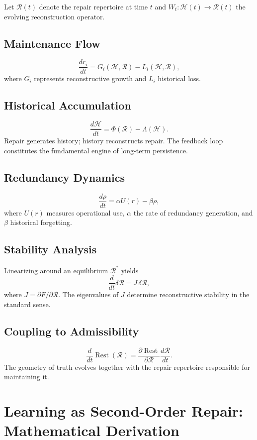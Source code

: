 \documentclass[12pt,oneside]{article}
\theoremstyle{plain}
\theoremstyle{definition}
\theoremstyle{remark}
\theoremstyle{plain}
\DeclareMathOperator{\Rest}{Rest}
\newcommand{\Hist}{\mathcal{H}}
\begin{document}
Let $\mathcal{R}(t)$ denote the repair repertoire at time $t$ and $W_t : \Hist(t) \rightarrow
\mathcal{R}(t)$ the evolving reconstruction operator.

\subsection{Maintenance Flow}

\[
\frac{dr_i}{dt} = G_i(\Hist, \mathcal{R}) - L_i(\Hist, \mathcal{R}),
\]
where $G_i$ represents reconstructive growth and $L_i$ historical loss.

\subsection{Historical Accumulation}

\[
\frac{d\Hist}{dt} = \Phi(\mathcal{R}) - \Lambda(\Hist).
\]
Repair generates history; history reconstructs repair. The feedback loop constitutes the
fundamental engine of long-term persistence.

\subsection{Redundancy Dynamics}

\[
\frac{d\rho}{dt} = \alpha U(r) - \beta\rho,
\]
where $U(r)$ measures operational use, $\alpha$ the rate of redundancy generation, and $\beta$
historical forgetting.

\subsection{Stability Analysis}

Linearizing around an equilibrium $\mathcal{R}^*$ yields
\[
\frac{d}{dt}\delta\mathcal{R} = J\,\delta\mathcal{R},
\]
where $J = \partial F / \partial\mathcal{R}$. The eigenvalues of $J$ determine reconstructive
stability in the standard sense.

\subsection{Coupling to Admissibility}

\[
\frac{d}{dt}\Rest(\mathcal{R}) = \frac{\partial\Rest}{\partial\mathcal{R}}\frac{d\mathcal{R}}{dt}.
\]
The geometry of truth evolves together with the repair repertoire responsible for maintaining it.

\section{Learning as Second-Order Repair: Mathematical Derivation}
\end{document}
